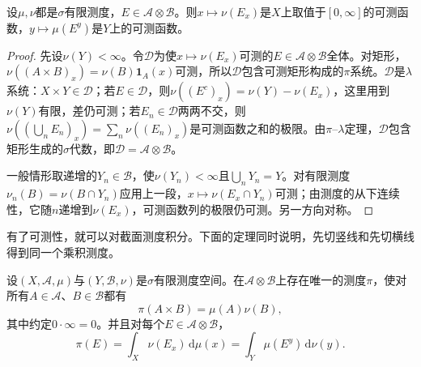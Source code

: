\begin{lemma}[截面测度的可测性]
\label{lem:integral-section-measure-measurable}
设$\mu,\nu$都是$\sigma$有限测度，$E\in\mathcal A\otimes\mathcal B$。则$x\mapsto\nu(E_x)$是$X$上取值于$[0,\infty]$的可测函数，$y\mapsto\mu(E^y)$是$Y$上的可测函数。
\end{lemma}

\begin{proof}
先设$\nu(Y)<\infty$。令$\mathcal D$为使$x\mapsto\nu(E_x)$可测的$E\in\mathcal A\otimes\mathcal B$全体。对矩形，$\nu((A\times B)_x)=\nu(B)\mathbf 1_A(x)$可测，所以$\mathcal D$包含可测矩形构成的$\pi$系统。$\mathcal D$是$\lambda$系统：$X\times Y\in\mathcal D$；若$E\in\mathcal D$，则$\nu((E^c)_x)=\nu(Y)-\nu(E_x)$，这里用到$\nu(Y)$有限，差仍可测；若$E_n\in\mathcal D$两两不交，则$\nu((\bigcup_nE_n)_x)=\sum_n\nu((E_n)_x)$是可测函数之和的极限。由$\pi$--$\lambda$定理，$\mathcal D$包含矩形生成的$\sigma$代数，即$\mathcal D=\mathcal A\otimes\mathcal B$。

一般情形取递增的$Y_n\in\mathcal B$，使$\nu(Y_n)<\infty$且$\bigcup_nY_n=Y$。对有限测度$\nu_n(B)=\nu(B\cap Y_n)$应用上一段，$x\mapsto\nu(E_x\cap Y_n)$可测；由测度的从下连续性，它随$n$递增到$\nu(E_x)$，可测函数列的极限仍可测。另一方向对称。
\end{proof}

有了可测性，就可以对截面测度积分。下面的定理同时说明，先切竖线和先切横线得到同一个乘积测度。

\begin{theorem}[乘积测度的存在唯一性]
\label{thm:integral-product-measure-exists}
设$(X,\mathcal A,\mu)$与$(Y,\mathcal B,\nu)$是$\sigma$有限测度空间。在$\mathcal A\otimes\mathcal B$上存在唯一的测度$\pi$，使对所有$A\in\mathcal A$、$B\in\mathcal B$都有
\begin{equation}
 \pi(A\times B)=\mu(A)\nu(B),
 \label{eq:integral-product-rectangle}
\end{equation}
其中约定$0\cdot\infty=0$。并且对每个$E\in\mathcal A\otimes\mathcal B$，
\begin{equation}
 \pi(E)=\int_X\nu(E_x)\,\mathrm d\mu(x)=\int_Y\mu(E^y)\,\mathrm d\nu(y).
 \label{eq:integral-product-sections}
\end{equation}
\end{theorem}

